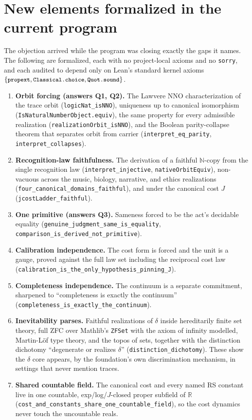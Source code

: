 \documentclass[11pt,a4paper]{article}
\theoremstyle{definition}
\theoremstyle{remark}
\newcommand{\code}[1]{\texttt{\small #1}}
\begin{document}
\section{New elements formalized in the current program}\label{sec:new}

The objection arrived while the program was closing exactly the gaps it names.
The following are formalized, each with no project-local axioms and no
\code{sorry}, and each audited to depend only on Lean's standard kernel axioms
$\{\code{propext}, \code{Classical.choice}, \code{Quot.sound}\}$.

\begin{enumerate}[leftmargin=2em]
  \item \textbf{Orbit forcing (answers Q1, Q2).} The Lawvere NNO characterization
    of the trace orbit (\code{logicNat\_isNNO}), uniqueness up to canonical
    isomorphism (\code{IsNaturalNumberObject.equiv}), the same property for every
    admissible realization (\code{realizationOrbit\_isNNO}), and the Boolean
    parity-collapse theorem that separates orbit from carrier
    (\code{interpret\_eq\_parity}, \code{interpret\_collapses}).
  \item \textbf{Recognition-law faithfulness.} The derivation of a faithful
    $\mathbb{N}$-copy from the single recognition law
    (\code{interpret\_injective}, \code{nativeOrbitEquiv}), non-vacuous across the
    music, biology, narrative, and ethics realizations
    (\code{four\_canonical\_domains\_faithful}), and under the canonical cost $J$
    (\code{jcostLadder\_faithful}).
  \item \textbf{One primitive (answers Q3).} Sameness forced to be the act's
    decidable equality (\code{genuine\_judgment\_same\_is\_equality},
    \code{comparison\_is\_derived\_not\_primitive}).
  \item \textbf{Calibration independence.} The cost form is forced and the unit is
    a gauge, proved against the full law set including the reciprocal cost law
    (\code{calibration\_is\_the\_only\_hypothesis\_pinning\_J}).
  \item \textbf{Completeness independence.} The continuum is a separate
    commitment, sharpened to ``completeness is exactly the continuum''
    (\code{completeness\_is\_exactly\_the\_continuum}).
  \item \textbf{Inevitability parses.} Faithful realizations of $\delta$ inside
    hereditarily finite set theory, full ZFC over Mathlib's \code{ZFSet} with the
    axiom of infinity modelled, Martin-L\"of type theory, and the topos of sets,
    together with the distinction dichotomy ``degenerate or realizes $\delta$''
    (\code{distinction\_dichotomy}). These show the $\delta$ core appears, by the
    foundation's own discrimination mechanism, in settings that never mention
    traces.
  \item \textbf{Shared countable field.} The canonical cost and every named RS
    constant live in one countable, exp/log/$J$-closed proper subfield of
    $\mathbb{R}$ (\code{cost\_and\_constants\_share\_one\_countable\_field}), so
    the cost dynamics never touch the uncountable reals.
\end{enumerate}
\end{document}
